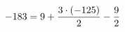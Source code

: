 \documentclass[preview]{standalone}
\begin{document}
\begin{align*}
\special{dvisvgm:raw <g id='unique000'>}-183 = 9 +\frac{3 \cdot (-125)}{2} - \frac{9}{2}\special{dvisvgm:raw </g>}
\end{align*}
\end{document}
